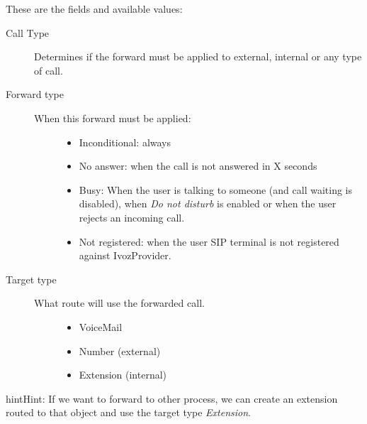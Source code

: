 \documentclass[letterpaper,10pt,english]{sphinxmanual}
\begin{document}
These are the fields and available values:
\begin{description}
\item[{Call Type}] \leavevmode{}\label{company/users:term-call-type}
Determines if the forward must be applied to external, internal or any
type of call.

\item[{Forward type}] \leavevmode{}\label{company/users:term-forward-type}\begin{description}
\item[{When this forward must be applied:}] \leavevmode\begin{itemize}
\item {} 
Inconditional: always

\item {} 
No answer: when the call is not answered in X seconds

\item {} 
Busy: When the user is talking to someone (and call waiting is
disabled), when \emph{Do not disturb} is enabled or when the user
rejects an incoming call.

\item {} 
Not registered: when the user SIP terminal is not registered
against IvozProvider.

\end{itemize}

\end{description}

\item[{Target type}] \leavevmode{}\label{company/users:term-target-type}\begin{description}
\item[{What route will use the forwarded call.}] \leavevmode\begin{itemize}
\item {} 
VoiceMail

\item {} 
Number (external)

\item {} 
Extension (internal)

\end{itemize}

\end{description}

\end{description}

\begin{notice}{hint}{Hint:}
If we want to forward to other process, we can create an extension
routed to that object and use the target type \emph{Extension}.
\end{notice}
\end{document}
